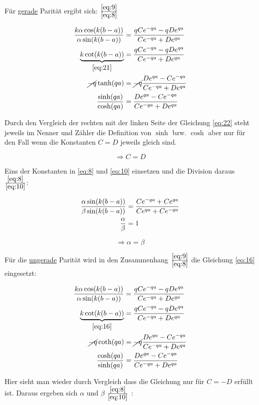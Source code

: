 Für \underline{gerade} Parität ergibt sich:
\(\frac{\eqref{eq:9}}{\eqref{eq:8}}\)

\begin{align}  
  \frac{k\alpha\cos(k(b-a))}{\alpha\sin(k(b-a))} &= \frac{qCe^{-qa}-qDe^{qa}}{Ce^{-qa}+De^{qa}}\\
\underbrace{k\cot(k(b-a))}_{\eqref{eq:21}} &= \frac{qCe^{-qa}-qDe^{qa}}{Ce^{-qa}+De^{qa}}\\
\cancel{-q} \tanh(qa) &=\cancel{ -q} \frac{De^{qa}-Ce^{-qa}}{Ce^{-qa}+De^{qa}}\\
\frac{\sinh(qa)}{\cosh(qa)} &= \frac{De^{qa}-Ce^{-qa}}{Ce^{-qa}+De^{qa}}\label{eq:22}
\end{align}

Durch den Vergleich der rechten mit der linken Seite der Gleichung \eqref{eq:22} steht jeweils im Nenner und Zähler die Definition von \(\sinh\) bzw. \(\cosh\) aber nur für den Fall wenn die Konstanten \(C=D\) jeweils gleich sind.

\[\Rightarrow C=D\]

Eins der Konstanten in \eqref{eq:8} und  \eqref{eq:10} einsetzen und die Division daraus \(\frac{\eqref{eq:8}}{\eqref{eq:10}}\):

\begin{align}
  \label{eq:23}
\frac{\alpha\sin(k(b-a))}{\beta\sin(k(b-a))} &= \frac{Ce^{-qa}+Ce^{qa}}{ Ce^{qa}+Ce^{-qa}}  \notag\\
\frac{\alpha}{\beta} &= 1 
\end{align}

\begin{equation}
  \label{eq:24}
 \Rightarrow  \alpha = \beta
\end{equation}

Für die \underline{ungerade} Parität wird in den Zusammenhang \(\frac{\eqref{eq:9}}{\eqref{eq:8}}\) die Gleichung \eqref{eq:16} eingesetzt:

\begin{align}  
  \frac{k\alpha\cos(k(b-a))}{\alpha\sin(k(b-a))} &= \frac{qCe^{-qa}-qDe^{qa}}{Ce^{-qa}+De^{qa}}\\
\underbrace{k\cot(k(b-a))}_{\eqref{eq:16}} &= \frac{qCe^{-qa}-qDe^{qa}}{Ce^{-qa}+De^{qa}}\\
\cancel{-q} \coth(qa) &=\cancel{ -q} \frac{De^{qa}-Ce^{-qa}}{Ce^{-qa}+De^{qa}}\\
\frac{\cosh(qa)}{\sinh(qa)} &= \frac{De^{qa}-Ce^{-qa}}{Ce^{-qa}+De^{qa}}\label{eq:24_1}
\end{align}

Hier sieht man wieder durch Vergleich dass die Gleichung nur für \(C=-D\) erfüllt ist. Daraus ergeben sich \(\alpha\) und \(\beta\)  \(\frac{\eqref{eq:8}}{\eqref{eq:10}}\) :

